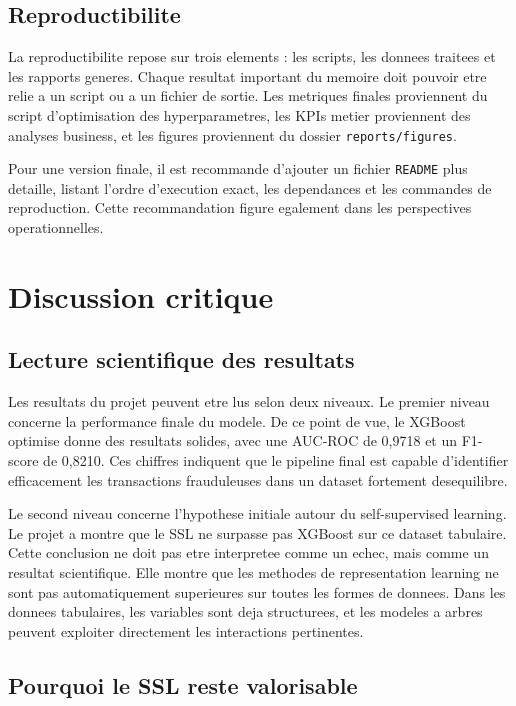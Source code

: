 ﻿\documentclass[12pt,a4paper,oneside]{report}
\begin{document}
\section{Reproductibilite}

La reproductibilite repose sur trois elements : les scripts, les donnees traitees et les rapports generes. Chaque resultat important du memoire doit pouvoir etre relie a un script ou a un fichier de sortie. Les metriques finales proviennent du script d'optimisation des hyperparametres, les KPIs metier proviennent des analyses business, et les figures proviennent du dossier \texttt{reports/figures}.

Pour une version finale, il est recommande d'ajouter un fichier \texttt{README} plus detaille, listant l'ordre d'execution exact, les dependances et les commandes de reproduction. Cette recommandation figure egalement dans les perspectives operationnelles.

\chapter{Discussion critique}

\section{Lecture scientifique des resultats}

Les resultats du projet peuvent etre lus selon deux niveaux. Le premier niveau concerne la performance finale du modele. De ce point de vue, le XGBoost optimise donne des resultats solides, avec une AUC-ROC de 0,9718 et un F1-score de 0,8210. Ces chiffres indiquent que le pipeline final est capable d'identifier efficacement les transactions frauduleuses dans un dataset fortement desequilibre.

Le second niveau concerne l'hypothese initiale autour du self-supervised learning. Le projet a montre que le SSL ne surpasse pas XGBoost sur ce dataset tabulaire. Cette conclusion ne doit pas etre interpretee comme un echec, mais comme un resultat scientifique. Elle montre que les methodes de representation learning ne sont pas automatiquement superieures sur toutes les formes de donnees. Dans les donnees tabulaires, les variables sont deja structurees, et les modeles a arbres peuvent exploiter directement les interactions pertinentes.

\section{Pourquoi le SSL reste valorisable}
\end{document}
